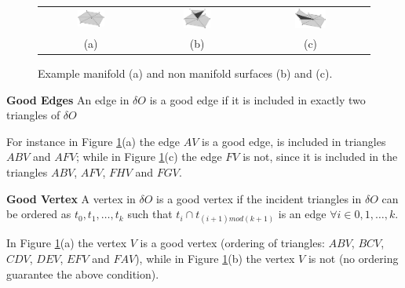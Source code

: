 \begin{figure}
 \begin{tabular}{ccc}
  \includegraphics[width=0.28\textwidth]{./img/manifold}&
  \includegraphics[width=0.28\textwidth]{./img/notmanifold1}&
  \includegraphics[width=0.28\textwidth]{./img/notmanifold2}\\
  (a) & (b) & (c)
 \end{tabular}
 \caption{Example manifold (a) and non manifold surfaces (b) and (c).}
 \label{fig:manif}
 
\end{figure}



\begin{mydef}
\textbf{Good Edges}
An edge in $\delta O$ is a good edge if it is included in exactly two triangles of $\delta O$
\end{mydef}

For instance in Figure \ref{fig:manif}(a) the edge $AV$  is a good edge, is included in triangles $ABV$ and $AFV$; while in Figure \ref{fig:manif}(c) the edge $FV$ is not, since it is included in the triangles $ABV$, $AFV$, $FHV$ and $FGV$.

\begin{mydef}
\textbf{Good Vertex}
A vertex in $\delta O$  is a good vertex if the incident triangles in $\delta O$  can be ordered as
$t_0 , t_1, \dots, t_k$  such that $t_i \cap t_{(i+1) mod (k+1)}$ is an edge $\forall i \in {0, 1, \dots, k}$.
\end{mydef}

In Figure \ref{fig:manif}(a) the vertex $V$  is a good vertex (ordering of triangles: $ABV$, $BCV$, $CDV$, $DEV$, $EFV$ and $FAV$), while in Figure \ref{fig:manif}(b) the vertex $V$ is not (no ordering guarantee the above condition).

